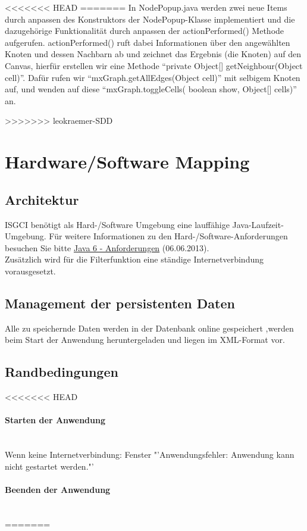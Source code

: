 \documentclass[10pt,a4paper]{article}
\begin{document}
\begin{itemize}
<<<<<<< HEAD
=======
In NodePopup.java werden zwei neue Items durch anpassen des Konstruktors der NodePopup-Klasse implementiert und die dazugehörige Funktionalität durch anpassen der actionPerformed() Methode aufgerufen. actionPerformed() ruft dabei Informationen über den angewählten Knoten und dessen Nachbarn ab und zeichnet das Ergebnis (die Knoten) auf den Canvas, hierfür erstellen wir eine Methode "`private Object[] getNeighbour(Object cell)"'. Dafür rufen wir "`mxGraph.getAllEdges(Object cell)"' mit selbigem Knoten auf, und wenden auf diese "`mxGraph.toggleCells( boolean show, Object[] cells)"' an.


\newpage
>>>>>>> leokraemer-SDD
\section{Hardware/Software Mapping}
\subsection{Architektur}
ISGCI benötigt als Hard-/Software Umgebung eine lauffähige Java-Laufzeit-Umgebung. Für weitere Informationen zu den Hard-/Software-Anforderungen besuchen Sie bitte 
\href{http://www.oracle.com/technetwork/java/javase/system-configurations-135212.html}{Java 6 - Anforderungen} (06.06.2013).
\\Zusätzlich wird für die Filterfunktion eine ständige Internetverbindung vorausgesetzt.

\subsection{Management der persistenten Daten}
Alle zu speichernde Daten werden in der Datenbank online gespeichert ,werden beim Start der Anwendung heruntergeladen und liegen im XML-Format vor.
\subsection{Randbedingungen}
<<<<<<< HEAD
\paragraph{Starten der Anwendung}\ \\
Wenn keine Internetverbindung: Fenster "'Anwendungsfehler: Anwendung kann nicht gestartet werden."'
\paragraph{Beenden der Anwendung}\ \\
=======

\end{itemize}
\end{document}
